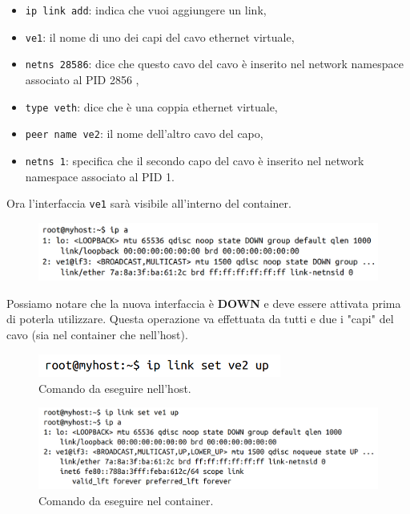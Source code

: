 \begin{itemize}
    \item \verb|ip link add|: indica che vuoi aggiungere un link,
    \item \verb|ve1|: il nome di uno dei capi del cavo ethernet virtuale,
    \item \verb|netns 28586|: dice che questo cavo del cavo è inserito nel
          network namespace associato al PID 2856 ,
    \item \verb|type veth|: dice che è una coppia ethernet virtuale,
    \item \verb|peer name ve2|: il nome dell'altro cavo del capo,
    \item \verb|netns 1|: specifica che il secondo capo del cavo è inserito nel
          network namespace associato al PID 1.
\end{itemize}

Ora l'interfaccia \verb|ve1| sarà visibile all'interno del container.

\begin{figure}[H]
    \centering
    \includegraphics[width=12cm, keepaspectratio]{capitoli/os_security/imgs/net4.png}
\end{figure}

Possiamo notare che la nuova interfaccia è \textbf{DOWN} e deve essere attivata
prima di poterla utilizzare. Questa operazione va effettuata da tutti e due i
"capi" del cavo (sia nel container che nell'host).

\begin{figure}[H]
    \centering
    \includegraphics[width=8cm, keepaspectratio]{capitoli/os_security/imgs/net5.png}
    \caption{Comando da eseguire nell'host.}
\end{figure}

\begin{figure}[H]
    \centering
    \includegraphics[width=12cm, keepaspectratio]{capitoli/os_security/imgs/net6.png}
    \caption{Comando da eseguire nel container.}
\end{figure}

